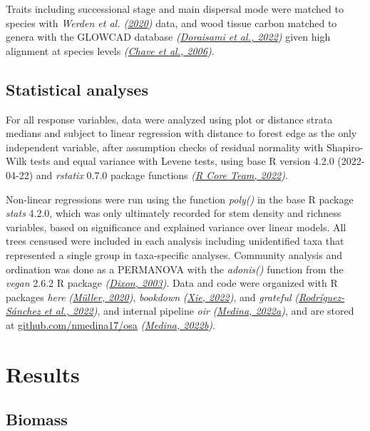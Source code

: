 \documentclass[
  12pt,
]{article}
\begin{document}
Traits including successional stage and main dispersal mode were matched to species with \emph{Werden et al. (\protect\hyperlink{ref-werden20}{2020})} data, and wood tissue carbon matched to genera with the GLOWCAD database \emph{(\protect\hyperlink{ref-doraisami22}{Doraisami et al., 2022})} given high alignment at species levels \emph{(\protect\hyperlink{ref-chave06}{Chave et al., 2006})}.

\hypertarget{statistical-analyses}{%
\subsection{Statistical analyses}\label{statistical-analyses}}

For all response variables, data were analyzed using plot or distance strata medians and subject to linear regression with distance to forest edge as the only independent variable, after assumption checks of residual normality with Shapiro-Wilk tests and equal variance with Levene tests, using base R version 4.2.0 (2022-04-22) and \emph{rstatix} 0.7.0 package functions \emph{(\protect\hyperlink{ref-base}{R Core Team, 2022})}.

Non-linear regressions were run using the function \emph{poly()} in the base R package \emph{stats} 4.2.0,
which was only ultimately recorded for stem density and richness variables, based on significance and explained variance over linear models.
All trees censused were included in each analysis including unidentified taxa that represented a single group in taxa-specific analyses.
Community analysis and ordination was done as a PERMANOVA with the \emph{adonis()} function from the \emph{vegan} 2.6.2 R package \emph{(\protect\hyperlink{ref-dixon03}{Dixon, 2003})}.
Data and code were organized with R packages \emph{here} \emph{(\protect\hyperlink{ref-here}{Müller, 2020})}, \emph{bookdown} \emph{(\protect\hyperlink{ref-bookdown2022}{Xie, 2022})}, and \emph{grateful} \emph{(\protect\hyperlink{ref-grateful}{Rodríguez-Sánchez et al., 2022})}, and internal pipeline \emph{oir} \emph{(\protect\hyperlink{ref-softwareMedina22oir}{Medina, 2022a})}, and are stored at \url{github.com/nmedina17/osa} \emph{(\protect\hyperlink{ref-softwareMedina22osa}{Medina, 2022b})}.

\hypertarget{results}{%
\section{Results}\label{results}}

\hypertarget{biomass}{%
\subsection{Biomass}\label{biomass}}
\end{document}
